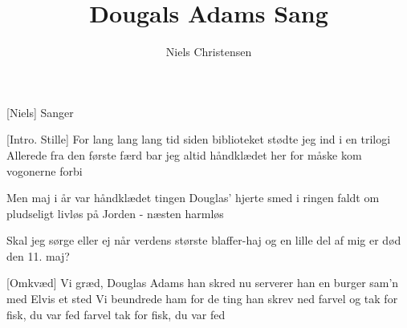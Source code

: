 \documentclass[a4paper,12pt]{article}
\title{Dougals Adams Sang}
\author{Niels Christensen}
\begin{document}
\maketitle

\begin{roles}
  [Niels] Sanger
\end{roles}

\begin{props}
\end{props}

\begin{song}

[Intro. Stille] For lang lang lang tid siden
biblioteket
stødte jeg ind i en trilogi
Allerede fra den første færd
bar jeg altid håndklædet her
for måske kom vogonerne forbi

Men maj i år var håndklædet tingen
Douglas' hjerte smed i ringen
faldt om pludseligt livløs
på Jorden - næsten harmløs 

Skal jeg sørge eller ej
når verdens største blaffer-haj
og en lille del af mig
er død den 11. maj?

[Omkvæd] 
Vi græd, Douglas Adams han skred
nu serverer han en burger sam'n med Elvis et sted
Vi beundrede ham for de ting han skrev ned
farvel og tak for fisk, du var fed
farvel tak for fisk, du var fed



\end{song}
\end{document}
